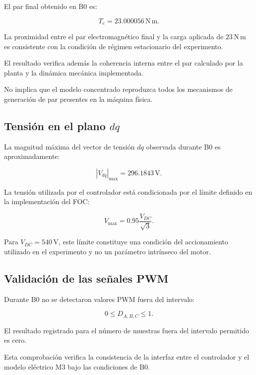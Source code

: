 El par final obtenido en B0 es:

\begin{equation}
T_e=
23.000056\,\mathrm{N\,m}.
\end{equation}

La proximidad entre el par electromagnético final y la carga aplicada de $23\,\mathrm{N\,m}$ es consistente con la condición de régimen estacionario del experimento.

El resultado verifica además la coherencia interna entre el par calculado por la planta y la dinámica mecánica implementada.

No implica que el modelo concentrado reproduzca todos los mecanismos de generación de par presentes en la máquina física.

\subsection{\texorpdfstring{Tensión en el plano $dq$}{Tensión en el plano dq}}

La magnitud máxima del vector de tensión $dq$ observada durante B0 es aproximadamente:

\begin{equation}
|V_{dq}|_{\max}
=
296.1843\,\mathrm{V}.
\end{equation}

La tensión utilizada por el controlador está condicionada por el límite definido en la implementación del FOC:

\begin{equation}
V_{\max}
=
0.95
\frac{V_{DC}}{\sqrt{3}}.
\end{equation}

Para $V_{DC}=540\,\mathrm{V}$, este límite constituye una condición del accionamiento utilizado en el experimento y no un parámetro intrínseco del motor.

\subsection{Validación de las señales PWM}

Durante B0 no se detectaron valores PWM fuera del intervalo:

\begin{equation}
0\leq D_{A,B,C}\leq1.
\end{equation}

El resultado registrado para el número de muestras fuera del intervalo permitido es cero.

Esta comprobación verifica la consistencia de la interfaz entre el controlador y el modelo eléctrico M3 bajo las condiciones de B0.

